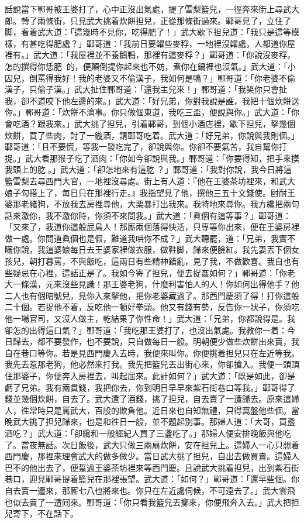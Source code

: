 話說當下鄆哥被王婆打了，心中正沒出氣處，提了雪梨籃兒，一徑奔來街上尋武大郎。轉了兩條街，只見武大挑着炊餅担兒，正從那條街過來。鄆哥見了，立住了脚，看着武大道：「這幾時不見你，吃得肥了！」武大歇下担兒道：「我只是這等模樣，有甚吃得肥處？」鄆哥道：「我前日要糴些麥稃，一地裡沒糴處，人都道你屋裡有。」武大道：「我屋裡並不養鵝鴨，那裡有這麥稃？」鄆哥道：「你說沒麥稃，怎的撰得你恁肥𦞂𦞂的，便顛倒提你起來也不妨，煮你在鍋裡也沒氣。」{}武大道：「小囚兒，倒罵得我好！我的老婆又不偷漢子，{}我如何是鴨？」鄆哥道：「你老婆不偷漢子，只偷子漢。」武大扯住鄆哥道：「還我主兒來！」鄆哥道：「我笑你只會扯我，卻不道咬下他左邊的來。」武大道：「好兄弟，你對我說是誰，我把十個炊餅送你。」鄆哥道：「炊餅不濟事。你只做個東道，我吃三盃，便說與你。」武大道：「你會吃酒？跟我來。」武大挑了担兒，引着鄆哥，到個小酒店裡，歇下担兒，拏幾個炊餅，買了些肉，討了一鏇酒，請鄆哥吃着。武大道：「好兄弟，你說與我則個。」鄆哥道：「且不要慌，等我一發吃完了，卻說與你。你卻不要氣苦，我自幫你打捉。」武大看那猴子吃了酒肉：「你如今卻說與我。」鄆哥道：「你要得知，把手來摸我頭上的肐𦞂。」武大道：「卻怎地來有這肐𦞂？」鄆哥道：「我對你說，我今日將這籃雪梨去尋西門大官，一地裡沒尋處。街上有人道：『他在王婆茶坊裡來，和武大娘子勾搭上了，每日只在那裡行走。』我指望見了他，撰他三五十文錢使。尀耐王婆那老豬狗，不放我去房裡尋他，大栗暴打出我來。我特地來尋你。我方纔把兩句話來激你，我不激你時，你須不來問我。」武大道：「眞個有這等事？」鄆哥道：「又來了，我道你這般屁鳥人！那厮兩個落得快活，只專等你出來，便在王婆房裡做一處。你問道眞個也是假，難道我哄你不成？」武大聽罷，道：「兄弟，我實不瞞你說，我這婆娘每日去王婆家裡做衣服，做鞋脚，歸來便臉紅。我先妻丟下個女孩兒，朝打暮罵，不與飯吃，這兩日有些精神錯亂，見了我，不做歡喜。我自也有些疑忌在心裡，這話正是了。我如今寄了担兒，便去捉姦如何？」鄆哥道：「你老大一條漢，元來沒些見識！那王婆老狗，什麼利害怕人的人！你如何出得他手？他二人也有個暗號兒，見你入來拏他，把你老婆藏過了。那西門慶須了得！打你這般二十個。若捉他不着，反吃他一頓好拳頭。他又有錢有勢，反告你一狀子，你須吃他一場官司，又沒人做主，乾結果了你性命！」{}武大道：「兄弟，你都說得是。我卻怎的出得這口氣？」鄆哥道：「我吃那王婆打了，也沒出氣處。我教你一着：今日歸去，都不要發作，也不要說，只自做每日一般。明朝便少做些炊餅出來賣，我自在巷口等你。若是見西門慶入去時，我便來叫你。你便挑着担兒只在左近等我。我先去惹那老狗，他必然來打我。我先把籃兒丟出街心來，你卻搶入。我便一頭頂住那婆子，你便奔入房裡去，叫起屈來。此計如何？」武大道：「既是如此，卻是虧了兄弟。我有兩貫錢，我把你去，你到明日早早來紫石街巷口等我。」鄆哥得了錢並幾個炊餅，自去了。武大還了酒錢，挑了担兒，自去賣了一遭歸去。原來這婦人，徃常時只是罵武大，百般的欺負他。近日來也自知無禮，只得窩盤他些個。{}當晚武大挑了担兒歸來，也是和徃日一般，並不題起別事。那婦人道：「大哥，買盞酒吃？」武大道：「卻纔和一般經紀人買了三盞吃了。」那婦人便安排晚飯與他吃了。當夜無話。次日飯後，武大只做三兩扇炊餅，安在担兒上。這婦人一心只想着西門慶，那裡來理會武大的做多做少。當日武大挑了担兒，自出去做買賣。這婦人巴不的他出去了，便踅過王婆茶坊裡來等西門慶。且說武大挑着担兒，出到紫石街巷口，迎見鄆哥提着籃兒在那裡張望。{}武大道：「如何？」鄆哥道：「還早些個。你自去賣一遭來，那厮七八也將來也。你只在左近處伺候，不可遠去了。」武大雲飛也似去賣了一遭囘來。鄆哥道：「你只看我籃兒丟擲來，你便飛奔入去。」武大把担兒寄下，不在話下。

